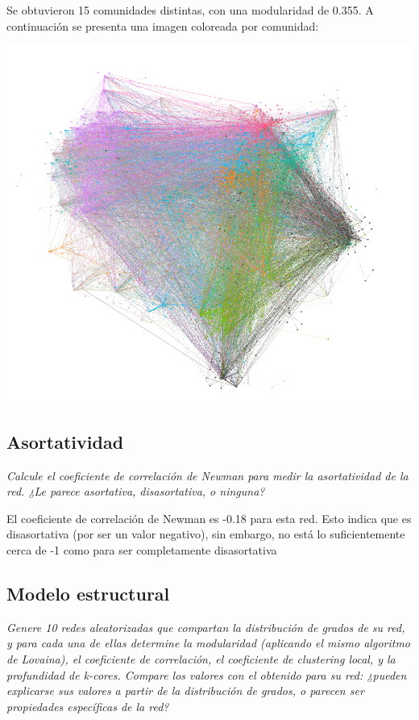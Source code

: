\documentclass[12pt]{article}
\begin{document}
Se obtuvieron 15 comunidades distintas, con una modularidad de 0.355. A continuación se presenta una imagen coloreada por comunidad:
\begin{center}
    \includegraphics[scale=0.4]{images/red_comunidades.png}
\end{center}
\subsection{Asortatividad}
\textit{Calcule el coeficiente de correlación de Newman para medir la asortatividad de la red. ¿Le parece asortativa, disasortativa, o ninguna?}

El coeficiente de correlación de Newman es -0.18 para esta red. Esto indica que es disasortativa (por ser un valor negativo), sin embargo, no está lo suficientemente cerca de -1 como para ser completamente disasortativa

\subsection{Modelo estructural} 
\textit{Genere 10 redes aleatorizadas que compartan la distribución de grados de su red, y para cada una de ellas determine la modularidad (aplicando el mismo algoritmo de Lovaina), el coeficiente de correlación, el coeficiente de clustering local, y la profundidad de k-cores. Compare los valores con el obtenido para su red: ¿pueden explicarse sus valores a partir de la distribución de grados, o parecen ser propiedades específicas de la red?}
\end{document}
